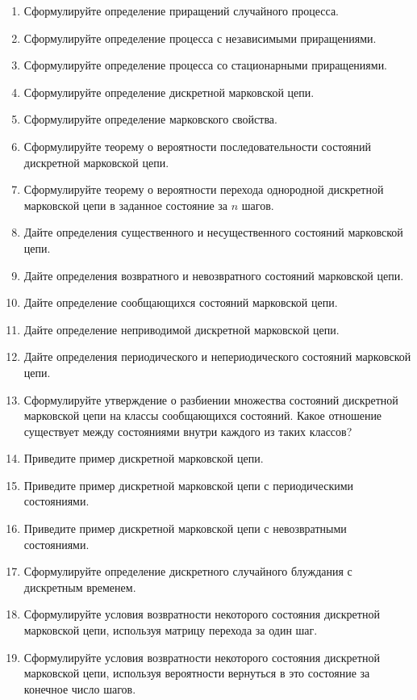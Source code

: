 \documentclass[a4paper,12pt]{extreport}
\renewcommand{\=}[1]{\stackrel{#1}{=}} %
\begin{document}
\begin{enumerate}
	\item Сформулируйте определение приращений случайного процесса.
	\item Сформулируйте определение процесса с независимыми приращениями.
	\item Сформулируйте определение процесса со стационарными приращениями.

	\item Сформулируйте определение дискретной марковской цепи.
	\item Сформулируйте определение марковского свойства.
	\item Сформулируйте теорему о вероятности последовательности
	состояний дискретной марковской цепи.
	\item Сформулируйте теорему о вероятности перехода однородной дискретной марковской цепи
	в заданное состояние за $n$ шагов.

	\item Дайте определения существенного и несущественного состояний марковской цепи.
	\item Дайте определения возвратного и невозвратного состояний марковской цепи.
	\item Дайте определение сообщающихся состояний марковской цепи.
	\item Дайте определение неприводимой дискретной марковской цепи.
	\item Дайте определения периодического и непериодического состояний марковской цепи.
	\item Сформулируйте утверждение о разбиении множества 
	состояний дискретной марковской цепи на классы сообщающихся состояний. Какое отношение
	существует между состояниями внутри каждого из таких классов?
	\item Приведите пример дискретной марковской цепи.
	\item Приведите пример дискретной марковской цепи с периодическими состояниями.
	\item Приведите пример дискретной марковской цепи с невозвратными состояниями.

	\item Сформулируйте определение дискретного случайного блуждания с дискретным временем.
	\item Сформулируйте условия возвратности некоторого состояния дискретной марковской цепи,
	используя матрицу перехода за один шаг.
	\item Сформулируйте условия возвратности некоторого состояния дискретной марковской цепи,
	используя вероятности вернуться в это состояние за конечное число шагов.


\end{enumerate}
\end{document}
